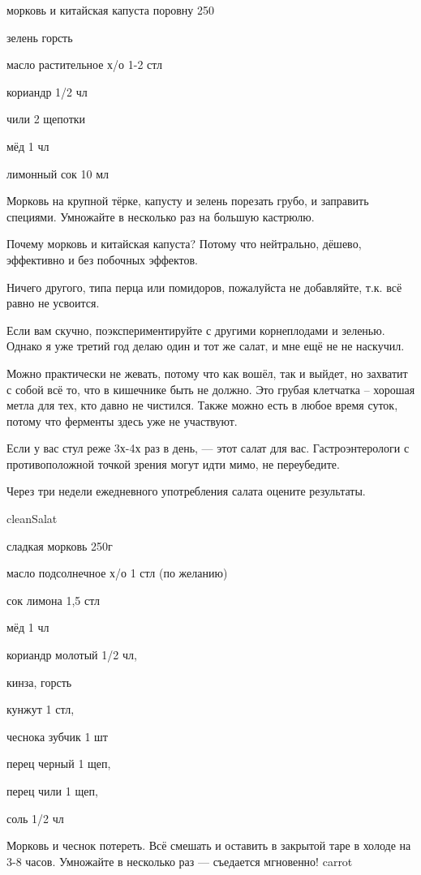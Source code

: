 {
\item морковь и китайская капуста поровну 250
\item зелень горсть
\item масло растительное х/о 1-2 стл
}{
\item кориандр 1/2 чл
\item чили 2 щепотки
\item мёд 1 чл
\item лимонный сок 10 мл
}{
Морковь на крупной тёрке, капусту и зелень порезать грубо, и заправить специями. Умножайте в несколько раз на большую кастрюлю.
}{
\begin{advice}
\item Почему морковь и китайская капуста? Потому что нейтрально, дёшево, эффективно и без побочных эффектов. 
\item Ничего другого, типа перца или помидоров, пожалуйста не добавляйте, т.к. всё равно не усвоится. 
\item Если вам скучно, поэкспериментируйте с другими корнеплодами и зеленью. Однако я уже третий год делаю один и тот же салат, и мне ещё не не наскучил.

\item Можно практически не жевать, потому что как вошёл, так и выйдет, но захватит с собой всё то, что в кишечнике быть не должно. Это грубая клетчатка – хорошая метла для тех, кто давно не чистился. Также можно есть в любое время суток, потому что ферменты здесь уже не участвуют.
\item Если у вас стул реже 3х-4х раз в день, — этот салат для вас. 
Гастроэнтерологи с противоположной точкой зрения могут идти мимо, не переубедите.


\item Через три недели ежедневного употребления салата оцените результаты. 

\end{advice}
}{cleanSalat}




{
\item сладкая морковь 250г
\item масло подсолнечное х/о 1 стл (по желанию)
\item сок лимона 1,5 стл
\item мёд 1 чл
\item кориандр молотый 1/2 чл,
\item кинза, горсть
}{
\item кунжут 1 стл,
\item чеснока зубчик 1 шт
\item перец черный 1 щеп,
\item перец чили 1 щеп,
\item соль 1/2 чл
}{
Морковь и чеснок потереть. Всё смешать и оставить в закрытой таре в холоде на 3-8 часов. Умножайте в несколько раз — съедается мгновенно!
}{}{carrot}



